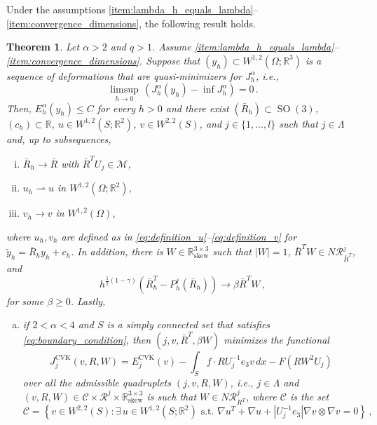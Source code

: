 \documentclass{article}
\theoremstyle{plain}
\newtheorem{teo}{Theorem}[section]
\theoremstyle{plain}
\theoremstyle{plain}
\theoremstyle{plain}
\theoremstyle{plain}
\theoremstyle{definition}
\theoremstyle{definition}
\renewcommand{\r}{\mathbb{R}}
\newcommand{\todeb}{\rightharpoonup}
\DeclareMathOperator{\SO}{SO}
\DeclareMathOperator{\skw}{skew}
\DeclareMathOperator{\CVK}{CVK}
\begin{document}
Under the assumptions \ref{item:lambda_h_equals_lambda}--\ref{item:convergence_dimensions}, the following result holds.
\begin{teo}\label{teo:convergence_minimizers}
	Let $\alpha > 2$ and $q > 1$. Assume \ref{item:lambda_h_equals_lambda}--\ref{item:convergence_dimensions}. Suppose that $(y_h) \subset W^{1,2}(\Omega; \r^3)$ is a sequence of deformations that are quasi-minimizers for $J_h^\alpha$, i.e.,
	\[
	\limsup_{h \to 0} \, (J_h^\alpha(y_h) - \inf J_h^\alpha) =0 \,.
	\]
	Then, $E_h^\alpha(y_h) \leq C$ for every $h > 0$ and there exist $(\bar R_h) \subset \SO(3)$, $(c_h) \subset \r$, $u \in W^{1, 2}(S; \r^2)$, $v \in W^{2, 2}(S)$, and $j \in \{1, \dots, l\}$ such that $j \in \Lambda$ and, up to subsequences,
	\begin{enumerate}[(i)]
		\item $\bar R_h \to \bar R$ with $\bar R^T U_j \in \mathcal{M}$,
		\item $u_h \todeb u$ in $W^{1, 2}(\Omega; \r^2)$,
		\item $v_h \to v$ in $W^{1, 2}(\Omega)$,
	\end{enumerate}
	where $u_h, v_h$ are defined as in \eqref{eq:definition_u}--\eqref{eq:definition_v} for $\tilde y_h = \bar R_h y_h + c_h$. In addition, there is $W \in \r^{3 \times 3}_{\skw}$ such that $|W| = 1$, $\bar R^TW \in N\mathcal{R}^j_{\bar R^T}$, and 
	\[
	h^{\frac{1}{2}(1-\gamma)}(\bar R_h^T - P^j_h(\bar R_h)) \to \beta \bar R^T W \,, \label{eq:convergence_difference_projections}
	\]
	for some $\beta \geq 0$. Lastly,
	\begin{enumerate}[(a)]
		\item if $2 < \alpha < 4$ and $S$ is  a simply connected set that satisfies \eqref{eq:boundary_condition}, then $(j, v, \bar R^T, \beta W)$ minimizes the functional
		\[
			J^{\CVK}_j(v, R, W) = E^{\CVK}_j(v) - \int_S f \cdot R U_j^{-1} e_3 v \, dx - F(R W^2 U_j)
		\]
		over all the admissible quadruplets
		$(j, v, R, W)$, i.e., $j \in \Lambda$ and $(v, R, W) \in \mathcal{C} \times \mathcal{R}^j \times \r^{3 \times 3}_{\skw}$ is such that $W \in N\mathcal{R}^j_{R^T}$, where $\mathcal{C}$ is the set
		\[
			\mathcal{C} = \left\{v \in W^{2, 2}(S) \colon \exists\, u \in W^{1, 2}(S; \r^2) \, \, \text{s.t.} \, \, \nabla u^T + \nabla u + |U_j^{-1}e_3| \nabla v \otimes \nabla v = 0\right\} \,,
		\]
		

\end{enumerate}
\end{teo}
\end{document}

